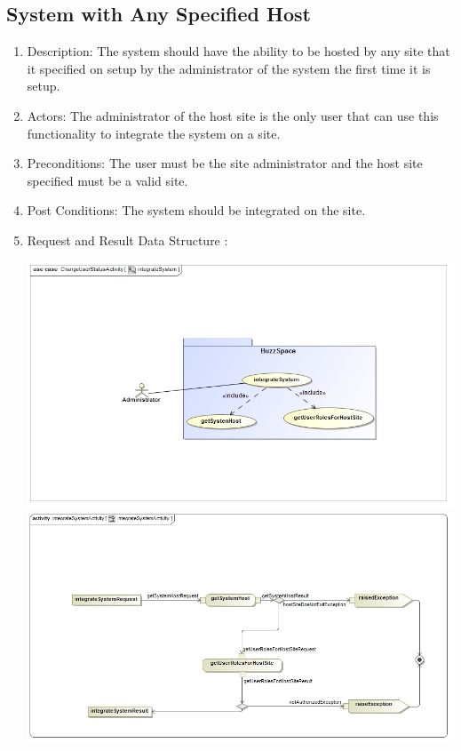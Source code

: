 \documentclass[12pt, oneside]{book}
\begin{document}
\subsection{System with Any Specified Host}
\begin{enumerate}
\item Description: The system should have the ability to be hosted by any site that it specified on setup by the administrator of the system the first time it is setup.
\item Actors: The administrator of the host site is the only user that can use this functionality to integrate the system on a site.
\item Preconditions: The user must be the site administrator and the host site specified must be a valid site.
\item Post Conditions: The system should be integrated on the site.
\item Request and Result Data Structure : 
\begin{center}
\includegraphics[scale=0.5]{integrateSystem.jpg}
\includegraphics[scale=0.5]{integrateSystemActivity.jpg}
\end{center}
\end{enumerate}
\end{document}
